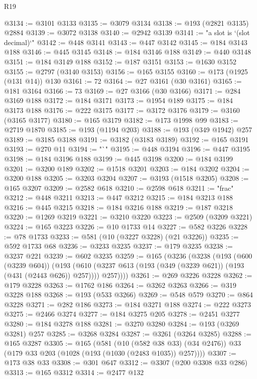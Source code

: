 \begin{lexlean}{R19}
\begin{coremodule}
@3134 := @3101 @3133
@3135 := @3079 @3134
@3138 := @193 (@2821 @3135) @2884
@3139 := @3072 @3138
@3140 := @2942 @3139
@3141 := "a slot is `(slot decimal)`"
@3142 := @448 @3141
@3143 := @447 @3142
@3145 := @184 @3143 @188
@3146 := @445 @3145
@3148 := @184 @3146 @188
@3149 := @440 @3148
@3151 := @184 @3149 @188
@3152 := @187 @3151
@3153 := @1630 @3152
@3155 := @2797 (@3140 @3153)
@3156 := @165 @3155
@3160 := @173 (@1925 (@131 @14)) @130
@3161 := 72
@3164 := @27 @3161 (@30 @3161)
@3165 := @181 @3164
@3166 := 73
@3169 := @27 @3166 (@30 @3166)
@3171 := @284 @3169 @188
@3172 := @184 @3171
@3173 := @1954 @189
@3175 := @184 @3173 @188
@3176 := @222 @3175
@3177 := @3172 @3176
@3179 := @3160 (@3165 @3177)
@3180 := @165 @3179
@3182 := @173 @1998 @99
@3183 := @2719 @1870
@3185 := @193 (@1194 @203)
@3188 := @193 (@349 @1942) @257
@3189 := @3185 @3188
@3191 := @3182 (@3183 @3189)
@3192 := @165 @3191
@3193 := @270 @11
@3194 := "`"
@3195 := @448 @3194
@3196 := @447 @3195
@3198 := @184 @3196 @188
@3199 := @445 @3198
@3200 := @184 @3199
@3201 := @3200 @189
@3202 := @1518 @3201
@3203 := @184 @3202
@3204 := @3200 @188
@3205 := @3203 @3204
@3207 := @3193 (@1518 @3205)
@3208 := @165 @3207
@3209 := @2582 @618
@3210 := @2598 @618
@3211 := "frac"
@3212 := @448 @3211
@3213 := @447 @3212
@3215 := @184 @3213 @188
@3216 := @445 @3215
@3218 := @184 @3216 @188
@3219 := @187 @3218
@3220 := @1269 @3219
@3221 := @3210 @3220
@3223 := @2509 (@3209 @3221)
@3224 := @165 @3223
@3226 := @10 @1733 @14
@3227 := @582 @3226
@3228 := @78 @1733
@3233 := @581 (@10 (@3227 @3228) (@21 @3226))
@3235 := @592 @1733 @68
@3236 := @3233 @3235
@3237 := @179 @3235
@3238 := @3237 @221
@3239 := @602 @3235
@3259 := @165
    (@3236
      (@3238
        (@193
          (@600 (@3239 @604))
          (@193
            (@610 (@3237 @613 (@193 (@349 (@3239 @621)) (@193 (@431 (@2443 @626)) @257))))
            @257))))
@3261 := @269 @3226 @3228
@3262 := @179 @3228
@3263 := @1762 @186
@3264 := @3262 @3263
@3266 := @319 @3228 @188
@3268 := @193 (@533 @3266)
@3269 := @548 @579
@3270 := @864 @3228
@3271 := @282 @186
@3273 := @184 @3271 @188
@3274 := @222 @3273
@3275 := @2466 @3274
@3277 := @184 @3275 @205
@3278 := @2451 @3277
@3280 := @184 @3278 @188
@3281 := @3270 @3280
@3284 := @193 (@3269 @3281) @257
@3285 := @3268 @3284
@3287 := @3261 (@3264 @3285)
@3288 := @165 @3287
@3305 := @165
    (@581
      (@10 (@582 @38 @33) (@34 @2476))
      @33
      (@179 @33 @203 (@1028 (@193 (@1030 (@2483 @1035)) @257))))
@3307 := @173 @38 @33
@3308 := @301 @647
@3312 := @3307 (@200 @3308 @33 @286)
@3313 := @165 @3312
@3314 := @2477 @132

\end{coremodule}
\end{lexlean}
